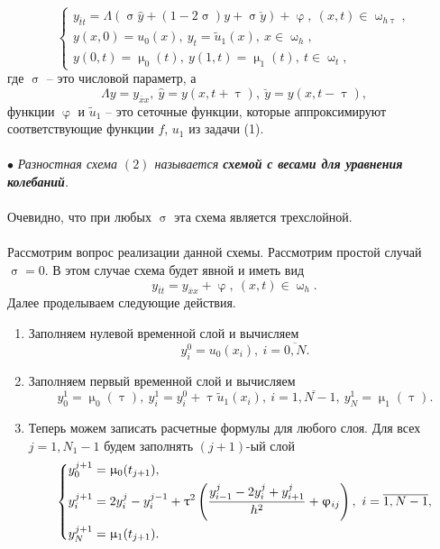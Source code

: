 \documentclass[a4paper, 12pt]{report}
\numberwithin{equation}{section}
\newcommand{\ol}{\overline}
\renewcommand{\varphi}{\upvarphi}
\renewcommand{\tau}{\uptau}
\renewcommand{\sigma}{\upsigma}
\renewcommand{\mu}{\upmu}
\renewcommand{\omega}{\upomega}
\begin{document}
	\begin{equation}
		\begin{cases}
			y_{\ol t t} = \Lambda (\sigma \hat y + (1-2\sigma)y +\sigma \check y) + \varphi,\ (x,t)\in \omega_{h\tau},\\
		y(x,0) = u_0(x),\ y_t = \tilde u_1(x),\ x \in \omega_{h},\\
		y(0,t) = \mu_0(t),\ y(1,t) = \mu_1(t),\ t \in \omega_t,
		\end{cases}
	\end{equation}
	где $\sigma$ -- это числовой параметр, а 
	$$\Lambda y = y_{\ol x x},\ \hat y = y(x, t+\tau),\ \breve y = y(x, t- \tau),$$
	функции $\varphi$ и $\tilde u_1$ -- это сеточные функции, которые
	аппроксимируют соответствующие функции $f$, $u_1$ из задачи (1).\\\\
	$\bullet$ \textit{Разностная схема $(2)$ называется \textbf{схемой с весами для уравнения колебаний}.}\\\\
	Очевидно, что при любых $\sigma$ эта схема является трехслойной.\\\\
	Рассмотрим вопрос реализации данной схемы. Рассмотрим простой случай $\sigma = 0$. В этом случае схема будет явной и иметь вид
	\begin{equation}
		y_{\ol t t} = y _{\ol x x} + \varphi,\ (x,t)\in \omega_h.
	\end{equation}
	Далее проделываем следующие действия.
	\begin{enumerate}
		\item Заполняем нулевой временной слой и вычисляем 
		\begin{equation}
			y_i^0 = u_0(x_i),\ i = \ol{0,N}.
		\end{equation}
		\item Заполняем первый временной слой и вычисляем 
		\begin{equation}
			y_0^1 = \mu_0(\tau),\ y_i^1 = y_i^0 + \tau \tilde u_1(x_i),\ i = \ol{1, N-1},\ y_N^1 = \mu_1(\tau).
		\end{equation}
		\item Теперь можем записать расчетные формулы для любого слоя. Для всех
		$j = {1, N_1-1}$ будем заполнять $(j+1)$-ый слой
		\begin{equation}
			\begin{dcases}
				y_0^{j+1} = \mu_0(t_{j+1}),\\ 
				y_i^{j+1} = 2y_i^j - y_i^{j-1} + \tau^2\left(\dfrac{y_{i-1}^j - 2y_i^j + y_{i+1}^j}{h^2} + \varphi_{ij}\right),\ i = \overline{1, N-1},\\ 
				y_N^{j+1} = \mu_1(t_{j+1}).
			\end{dcases}
		\end{equation}
	\end{enumerate}
\end{document}
